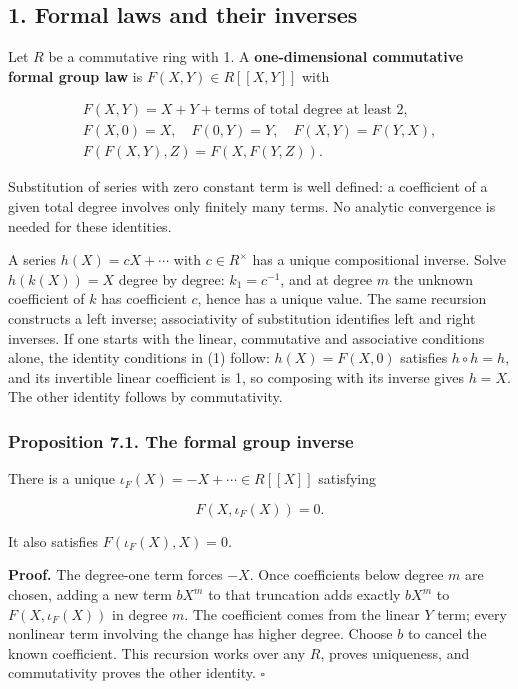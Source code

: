 \documentclass[11pt,a4paper]{article}
\begin{document}
\subsection{1. Formal laws and their
inverses}\label{formal-laws-and-their-inverses}

Let \(R\) be a commutative ring with 1. A \textbf{one-dimensional
commutative formal group law} is \(F(X,Y)\in R[[X,Y]]\) with

\[
\begin{gathered}
F(X,Y)=X+Y+\text{terms of total degree at least 2},\\
F(X,0)=X,\quad F(0,Y)=Y,\quad F(X,Y)=F(Y,X),\\
F(F(X,Y),Z)=F(X,F(Y,Z)).
\end{gathered}
\tag{1}
\]

Substitution of series with zero constant term is well defined: a
coefficient of a given total degree involves only finitely many terms.
No analytic convergence is needed for these identities.

A series \(h(X)=cX+\cdots\) with \(c\in R^\times\) has a unique
compositional inverse. Solve \(h(k(X))=X\) degree by degree:
\(k_1=c^{-1}\), and at degree \(m\) the unknown coefficient of \(k\) has
coefficient \(c\), hence has a unique value. The same recursion
constructs a left inverse; associativity of substitution identifies left
and right inverses. If one starts with the linear, commutative and
associative conditions alone, the identity conditions in (1) follow:
\(h(X)=F(X,0)\) satisfies \(h\circ h=h\), and its invertible linear
coefficient is 1, so composing with its inverse gives \(h=X\). The other
identity follows by commutativity.

\subsubsection{Proposition 7.1. The formal group
inverse}\label{proposition-7.1.-the-formal-group-inverse}

There is a unique \(\iota_F(X)=-X+\cdots\in R[[X]]\) satisfying

\[
F(X,\iota_F(X))=0.
\tag{2}
\]

It also satisfies \(F(\iota_F(X),X)=0\).

\textbf{Proof.} The degree-one term forces \(-X\). Once coefficients
below degree \(m\) are chosen, adding a new term \(bX^m\) to that
truncation adds exactly \(bX^m\) to \(F(X,\iota_F(X))\) in degree \(m\).
The coefficient comes from the linear \(Y\) term; every nonlinear term
involving the change has higher degree. Choose \(b\) to cancel the known
coefficient. This recursion works over any \(R\), proves uniqueness, and
commutativity proves the other identity. \(\square\)
\end{document}
